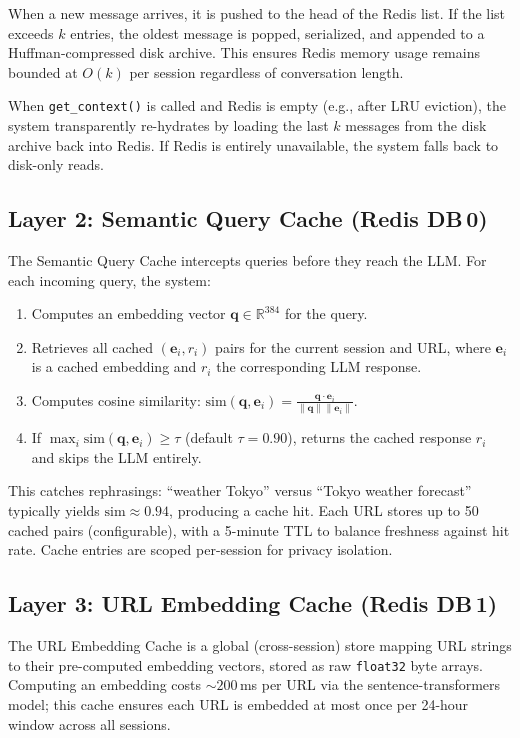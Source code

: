 \documentclass[conference]{IEEEtran}
\begin{document}
When a new message arrives, it is pushed to the head of the Redis list. If the list exceeds $k$ entries, the oldest message is popped, serialized, and appended to a Huffman-compressed disk archive. This ensures Redis memory usage remains bounded at $O(k)$ per session regardless of conversation length.

When \texttt{get\_context()} is called and Redis is empty (e.g., after LRU eviction), the system transparently re-hydrates by loading the last $k$ messages from the disk archive back into Redis. If Redis is entirely unavailable, the system falls back to disk-only reads.

\subsection{Layer 2: Semantic Query Cache (Redis DB\,0)}

The Semantic Query Cache intercepts queries before they reach the LLM. For each incoming query, the system:

\begin{enumerate}
\item Computes an embedding vector $\mathbf{q} \in \mathbb{R}^{384}$ for the query.
\item Retrieves all cached $(\mathbf{e}_i, r_i)$ pairs for the current session and URL, where $\mathbf{e}_i$ is a cached embedding and $r_i$ the corresponding LLM response.
\item Computes cosine similarity: $\text{sim}(\mathbf{q}, \mathbf{e}_i) = \frac{\mathbf{q} \cdot \mathbf{e}_i}{\|\mathbf{q}\| \|\mathbf{e}_i\|}$.
\item If $\max_i \text{sim}(\mathbf{q}, \mathbf{e}_i) \geq \tau$ (default $\tau{=}0.90$), returns the cached response $r_i$ and skips the LLM entirely.
\end{enumerate}

This catches rephrasings: ``weather Tokyo'' versus ``Tokyo weather forecast'' typically yields $\text{sim} \approx 0.94$, producing a cache hit. Each URL stores up to 50 cached pairs (configurable), with a 5-minute TTL to balance freshness against hit rate. Cache entries are scoped per-session for privacy isolation.

\subsection{Layer 3: URL Embedding Cache (Redis DB\,1)}

The URL Embedding Cache is a global (cross-session) store mapping URL strings to their pre-computed embedding vectors, stored as raw \texttt{float32} byte arrays. Computing an embedding costs ${\sim}200$\,ms per URL via the sentence-transformers model; this cache ensures each URL is embedded at most once per 24-hour window across all sessions.
\end{document}
